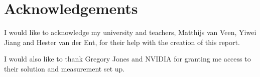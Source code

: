 \section{Acknowledgements}
I would like to acknowledge my university and teachers, Matthijs van Veen, Yiwei Jiang and Hester van der Ent, for their help with the creation of this report.

I would also like to thank Gregory Jones and NVIDIA for granting me access to their solution and measurement set up.